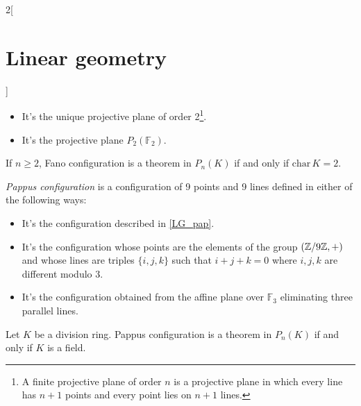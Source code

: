 \documentclass[../../../main.tex]{subfiles}
\begin{document}
\begin{multicols}{2}[\section{Linear geometry}]
\begin{definition}
\begin{itemize}
\begin{center}
\begin{minipage}{\linewidth}
                          \label{LG_fan}
                      \end{minipage}
                  \end{center}
            \item It's the unique projective plane of order 2\footnote{A finite projective plane of order $n$ is a  projective plane in which every line has $n+1$ points and every point lies on $n+1$ lines.}.
            \item It's the projective plane $P_2(\mathbb{F}_2)$.
        \end{itemize}
    \end{definition}
    \begin{theorem}
        If $n\geq 2$, Fano configuration is a theorem in $P_n(K)$ if and only if $\text{char}\,K=2$.
    \end{theorem}
    \begin{definition}
        \textit{Pappus configuration} is a configuration of 9 points and 9 lines defined in either of the following ways:
        \begin{itemize}
            \item It's the configuration described in \cref{LG_pap}.
                  \begin{center}
                      \begin{minipage}{\linewidth}
                          \centering
                          
                          \label{LG_pap}
                      \end{minipage}
                  \end{center}
            \item It's the configuration whose points are the elements of the group $(\mathbb{Z} /9\mathbb{Z} ,+)$ and whose lines are triples $\{i,j,k\}$ such that $i+j+k=0$ where $i,j,k$ are different modulo 3.
            \item It's the configuration obtained from the affine plane over $\mathbb{F}_3$ eliminating three parallel lines.
        \end{itemize}
    \end{definition}
    \begin{theorem}
        Let $K$ be a division ring. Pappus configuration is a theorem in $P_n(K)$ if and only if $K$ is a field.
    \end{theorem}

\end{multicols}
\end{document}
